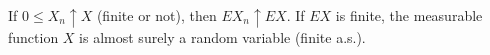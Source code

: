 If $0 \leq X_n \uparrow X$ (finite or not), then $E X_n \uparrow E X$. If $E X$ is finite, the measurable function $X$ is almost surely a random variable (finite a.s.).
